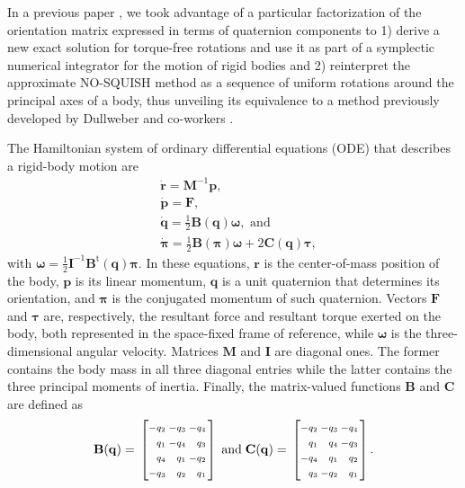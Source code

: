 \documentclass[
journal=jctcce,
layout=twocolumn
]{achemso}
\makeatletter
\newcommand{\mt}[1]{\boldsymbol{\mathbf{#1}}}   %
\newcommand{\vt}[1]{\boldsymbol{\mathbf{#1}}}   %
\newcommand{\tr}[1]{#1^\text{t}}                %
\newcommand{\diff}[2]{\frac{\partial #1}{\partial #2}} %
\newcommand{\Ham}[1]{{\mathcal H}_\text{#1}}    %
\newenvironment{smallarray}[1]                          %
{\null\,\vcenter\bgroup\scriptsize
	\renewcommand{\arraystretch}{1.5}
	\arraycolsep=.13885em
	\hbox\bgroup$\left[\array{@{}#1@{}}}
{\endarray\right]$\egroup\egroup\,\null}
\makeatother
\begin{document}
In a previous paper \cite{Silveira_2017}, we took advantage of a particular factorization of the orientation matrix expressed in terms of quaternion components to
1) derive a new exact solution for torque-free rotations and use it as part of a symplectic numerical integrator for the motion of rigid bodies and
2) reinterpret the approximate NO-SQUISH method \cite{Miller_2002} as a sequence of uniform rotations around the principal axes of a body, thus unveiling its equivalence to a method previously developed by Dullweber and co-workers \cite{Dullweber_1997}.

The Hamiltonian system of ordinary differential equations (ODE) that describes a rigid-body motion are \cite{Silveira_2017}
\begin{subequations}
	\label{eq:ODE system for NVE}
	\begin{align}
%
	&\dot{\vt r} =
	{\mt M}^{-1} {\vt p}, \\
%
	&\dot{\vt p} =
	{\vt F}, \\
%
	&\dot{\vt q} =
	\frac{1}{2} \mt B(\vt q) \vt \omega, \text{ and} \label{eq:EDO_q} \\
%
	&\dot{\vt \pi} =
	\frac{1}{2} \mt B(\vt \pi) \vt \omega + 2 \mt C(\vt q) \vt \tau, \label{eq:EDO_pi}
	\end{align}
\end{subequations}
with $\vt \omega = \frac{1}{2} {\mt I}^{-1} \tr{\mt B}(\vt q) {\vt \pi}$.
In these equations, $\vt r$ is the center-of-mass position of the body, $\vt p$ is its linear momentum, $\vt q$ is a unit quaternion that determines its orientation, and $\vt \pi$ is the conjugated momentum of such quaternion.
Vectors $\vt F$ and $\vt \tau$ are, respectively, the resultant force and resultant torque exerted on the body, both represented in the space-fixed frame of reference, while $\vt \omega$ is the three-dimensional angular velocity.
Matrices $\mt M$ and $\mt I$ are diagonal ones.
The former contains the body mass in all three diagonal entries while the latter contains the three principal moments of inertia.
Finally, the matrix-valued functions $\mt B$ and $\vt C$ are defined as
\begin{equation*}
\label{eq:def_B_and_C}
\mt B(\vt q) = \begin{smallarray}{rrrr}
-q_2 & -q_3 & -q_4 \\
 q_1 & -q_4 &  q_3 \\
 q_4 &  q_1 & -q_2 \\
-q_3 &  q_2 &  q_1
\end{smallarray}
%
\; \text{and} \;
%
\mt C(\vt q) = \begin{smallarray}{rrrr}
-q_2 & -q_3 & -q_4 \\
 q_1 &  q_4 & -q_3 \\
-q_4 &  q_1 &  q_2 \\
 q_3 & -q_2 &  q_1
\end{smallarray}.
\end{equation*}
\end{document}
